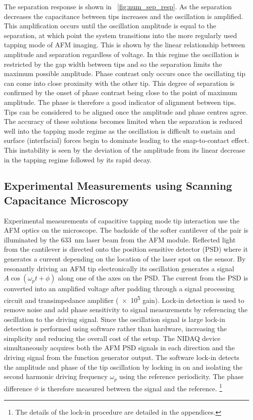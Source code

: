 \documentclass{article}
\begin{document}
The separation response is shown in \figurename~\ref{fig:num_sep_resp}. As the separation decreases the capacitance between tips increases and the oscillation is amplified. This amplification occurs until the oscillation amplitude is equal to the separation, at which point the system transitions into the more regularly used tapping mode of AFM imaging. This is shown by the linear relationship between amplitude and separation regardless of voltage. In this regime the oscillation is restricted by the gap width between tips and so the separation limits the maximum possible amplitude.
Phase contrast only occurs once the oscillating tip can come into close proximity with the other tip. This degree of separation is confirmed by the onset of phase contrast being close to the point of maximum amplitude. The phase is therefore a good indicator of alignment between tips. Tips can be considered to be aligned once the amplitude and phase centres agree. The accuracy of these solutions becomes limited when the separation is reduced well into the tapping mode regime as the oscillation is difficult to sustain and surface (interfacial) forces begin to dominate leading to the snap-to-contact effect. This instability is seen by the deviation of the amplitude from its linear decrease in the tapping regime followed by its rapid decay.

\FloatBarrier
\subsection{Experimental Measurements using Scanning Capacitance Microscopy}

Experimental measurements of capacitive tapping mode tip interaction use the AFM optics on the microscope. The backside of the softer cantilever of the pair is illuminated by the \SI{633}{nm} laser beam from the AFM module. Reflected light from the cantilever is directed onto the position sensitive detector (PSD) where it generates a current depending on the location of the laser spot on the sensor.
By resonantly driving an AFM tip electronically its oscillation generates a signal $A\cos(\omega_p t + \phi)$ along one of the axes on the PSD. The current from the PSD is converted into an amplified voltage after padding through a signal processing circuit and transimpedance amplifier (\num{e5} gain). Lock-in detection is used to remove noise and add phase sensitivity to signal measurements by referencing the oscillation to the driving signal. Since the oscillation signal is large lock-in detection is performed using software rather than hardware, increasing the simplicity and reducing the overall cost of the setup. The NIDAQ device simultaneously acquires both the AFM PSD signals in each direction and the driving signal from the function generator output. The software lock-in detects the amplitude and phase of the tip oscillation by locking in on and isolating the second harmonic driving frequency $\omega_p$ using the reference periodicity. The phase difference $\phi$ is therefore measured between the signal and the reference.%
\footnote{The details of the lock-in procedure are detailed in the appendices.}
\end{document}
